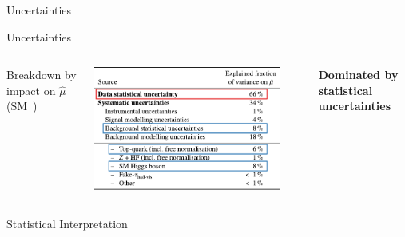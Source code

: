 \documentclass[11pt, xcolor={dvipsnames}, aspectratio=169]{beamer}
\begin{document}

\begin{frame}[standout]
  Uncertainties
\end{frame}


\begin{frame}{Uncertainties}
  \begin{columns}
     \centering

    Breakdown by impact on $\hat{\mu}$ (SM~\HH)

    \vspace*{1.0em}

    \includegraphics[width=0.9\textwidth]{uncertainty_table}


    \textbf{Dominated by statistical uncertainties}
  \end{columns}
\end{frame}


\begin{frame}[standout]
  Statistical Interpretation
\end{frame}

\end{document}
